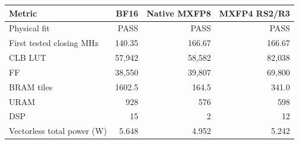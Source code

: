 \begin{tabular}{lrrr}
\toprule
Metric & BF16 & Native MXFP8 & MXFP4 RS2/R3 \\
\midrule
Physical fit & PASS & PASS & PASS \\
First tested closing MHz & 140.35 & 166.67 & 166.67 \\
CLB LUT & 57{,}942 & 58{,}582 & 82{,}038 \\
FF & 38{,}550 & 39{,}807 & 69{,}800 \\
BRAM tiles & 1602.5 & 164.5 & 341.0 \\
URAM & 928 & 576 & 598 \\
DSP & 15 & 2 & 12 \\
Vectorless total power (W) & 5.648 & 4.952 & 5.242 \\
\bottomrule
\end{tabular}
